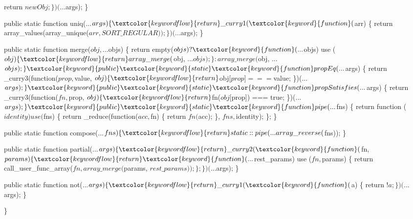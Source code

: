 \begin{DoxyCodeInclude}
            \textcolor{keywordflow}{return} $newObj;
        \})(...$args);
    \}

    \textcolor{keyword}{public} \textcolor{keyword}{static} \textcolor{keyword}{function} uniq(...$args) \{
        \textcolor{keywordflow}{return} \_curry1(\textcolor{keyword}{function}($arr) \{
            \textcolor{keywordflow}{return} array\_values(array\_unique($arr, SORT\_REGULAR));
        \})(...$args);
    \}

    \textcolor{keyword}{public} \textcolor{keyword}{static} \textcolor{keyword}{function} merge($obj, ...$objs) \{
        \textcolor{keywordflow}{return} empty($objs)
            ? \textcolor{keyword}{function}(...$objs) use ($obj) \{ \textcolor{keywordflow}{return} array\_merge($obj, ...$objs); \}
            : array\_merge($obj, ...$objs);
    \}

    \textcolor{keyword}{public} \textcolor{keyword}{static} \textcolor{keyword}{function} propEq(...$args) \{
        \textcolor{keywordflow}{return} \_curry3(\textcolor{keyword}{function}($prop, $value, $obj) \{
            \textcolor{keywordflow}{return} $obj[$prop] === $value;
        \})(...$args);
    \}

    \textcolor{keyword}{public} \textcolor{keyword}{static} \textcolor{keyword}{function} propSatisfies(...$args) \{
        \textcolor{keywordflow}{return} \_curry3(\textcolor{keyword}{function}($fn, $prop, $obj) \{
            \textcolor{keywordflow}{return} $fn($obj[$prop]) === \textcolor{keyword}{true};
        \})(...$args);
    \}

    \textcolor{keyword}{public} \textcolor{keyword}{static} \textcolor{keyword}{function} pipe(...$fns) \{
        \textcolor{keywordflow}{return} \textcolor{keyword}{function} ($identity) use ($fns) \{
            \textcolor{keywordflow}{return} \_reduce(\textcolor{keyword}{function}($acc, $fn) \{
                \textcolor{keywordflow}{return} $fn($acc);
            \}, $fns, $identity);
        \};
    \}

    \textcolor{keyword}{public} \textcolor{keyword}{static} \textcolor{keyword}{function} compose(...$fns) \{
        \textcolor{keywordflow}{return} static::pipe(...array\_reverse($fns));
    \}

    \textcolor{keyword}{public} \textcolor{keyword}{static} \textcolor{keyword}{function} partial(...$args) \{
        \textcolor{keywordflow}{return} \_curry2(\textcolor{keyword}{function}($fn, $params) \{
            \textcolor{keywordflow}{return} \textcolor{keyword}{function}(...$rest\_params) use ($fn, $params) \{
                \textcolor{keywordflow}{return} call\_user\_func\_array($fn, array\_merge($params, $rest\_params));
            \};
        \})(...$args);
    \}

    \textcolor{keyword}{public} \textcolor{keyword}{static} \textcolor{keyword}{function} not(...$args) \{
        \textcolor{keywordflow}{return} \_curry1(\textcolor{keyword}{function}($a) \{
            \textcolor{keywordflow}{return} !$a;
        \})(...$args);
    \}

\}
\end{DoxyCodeInclude}
 